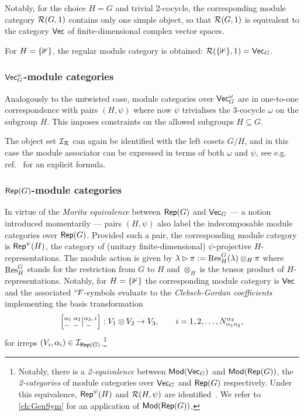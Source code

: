 Notably, for the choice $H=G$ and trivial 2-cocycle, the corresponding module category $\mathcal{R}(G,1)$ contains only one simple object, so that $\mathcal{R}(G,1)$ is equivalent to the category $\mathsf{Vec}$ of finite-dimensional complex vector spaces.

For $H=\{\mathbb 1\}$, the regular module category is obtained: $\mathcal{R}(\{\mathbb 1\},1)=\mathsf{Vec}_G$.
\subsubsection{$\mathsf{Vec}_G^\omega$-module categories} Analogously to the untwisted case, module categories over $\mathsf{Vec}_G^\omega$ are in one-to-one correspondence with pairs $(H,\psi)$ where now $\psi$ trivialises the 3-cocycle $\omega$ on the subgroup $H$. This imposes constraints on the allowed subgroups $H\subseteq G$. 

The object set $\mathcal{I}_{\mathcal{R}}$ can again be identified with the left cosets $G/H$, and in this case the module associator can be expressed in terms of both $\omega$ and $\psi$, see e.g. ref.~\cite{GarreRubio2022} for an explicit formula.
\subsubsection{$\mathsf{Rep}(G)$-module categories} In virtue of the \emph{Morita equivalence} between $\mathsf{Rep}(G)$ and $\mathsf{Vec}_G$ --- a notion introduced momentarily --- pairs $(H,\psi)$ also label the indecomposable module categories over $\mathsf{Rep}(G)$. Provided such a pair, the corresponding module category is $\mathsf{Rep}^\psi(H)$, the category of (unitary finite-dimensional) $\psi$-projective $H$-representations. The module action is given by $\lambda\act\pi := {\Res}^G_H(\lambda)\otimes_H\pi$ where ${\Res}^G_H$ stands for the restriction from $G$ to $H$ and $\otimes_H$ is the tensor product of $H$-representations. Notably, for $H=\{\mathbb 1\}$ the corresponding module category is $\mathsf{Vec}$ and the associated ${}^{\rhd\!\!} F$-symbols evaluate to the \emph{Clebsch-Gordan coefficients} implementing the basis transformation
\begin{equation}
	\CC{\alpha_1}{\alpha_2}{\alpha_3,\, i}{-}{-}{\,\, -} : V_1 \otimes V_2 \rightarrow V_3, \qquad i =1,2,\dots, N_{\alpha_1\alpha_2}^{\alpha_3},
\end{equation}
for irreps $(V_i,\alpha_i)\in\mathcal{I}_{\mathsf{Rep}(G)}$.\footnote{Notably, there is a \emph{2-equivalence} between $\mathsf{Mod}(\mathsf{Vec}_G)$ and $\mathsf{Mod}(\mathsf{Rep}(G))$, the \emph{2-categories} of module categories over $\mathsf{Vec}_G$ and $\mathsf{Rep}(G)$ respectively. Under this equivalence, $\mathsf{Rep}^\psi(H)$ and $\mathcal{R}(H,\psi)$ are identified~\cite{Greenough2010}. We refer to \cref{ch:GenSym} for an application of $\mathsf{Mod}(\mathsf{Rep}(G))$.}
